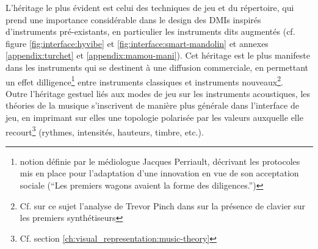  \noindent L'héritage le plus évident est celui des techniques de jeu et du répertoire, qui prend une importance considérable dans le design des \glspl{DMI} inspirés d'instruments pré-existants, en particulier les instruments dits augmentés (cf. figure \ref{fig:interface:hyvibe} et \ref{fig:interface:smart-mandolin} et annexes \ref{appendix:turchet} et \ref{appendix:mamou-mani}). Cet héritage est le plus manifeste dans les instruments qui se destinent à une diffusion commerciale, en permettant un effet dilligence\footnote{notion définie par le médiologue Jacques Perriault, décrivant les protocoles mis en place pour l'adaptation d'une innovation en vue de son acceptation sociale (``Les premiers wagons avaient la forme des diligences.'')} entre instruments classiques et instruments nouveaux\footnote{\label{fn-Pinch}Cf. sur ce sujet l'analyse de Trevor Pinch dans \cite{pinch_why_2001} sur la présence de clavier sur les premiers synthétiseurs}.\\
 \indent Outre l'héritage gestuel liés aux modes de jeu sur les instruments acoustiques, les théories de la musique s'inscrivent de manière plus générale dans l'interface de jeu, en imprimant sur elles une topologie polarisée par les valeurs auxquelle elle recourt\footnote{Cf. section \ref{ch:visual_representation:music-theory}} (rythmes, intensités, hauteurs, timbre, etc.).


